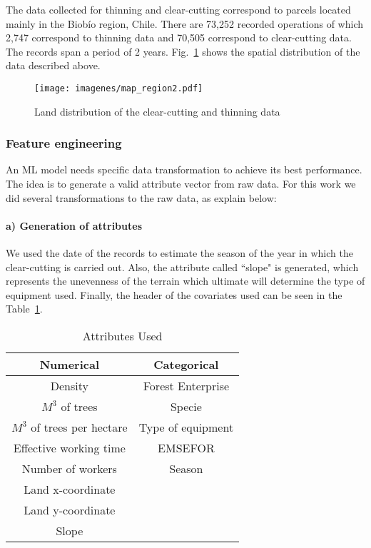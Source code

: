 \documentclass[conference]{IEEEtran}
\begin{document}
The data collected for thinning and clear-cutting correspond to parcels located mainly in the Biobío region, Chile. There are 73,252 recorded operations of which 2,747 correspond to thinning data and 70,505 correspond to clear-cutting data. The records span a period of 2 years. Fig.~\ref{fig1} shows the spatial distribution of the data described above.

\begin{figure}[htbp]
\centerline{\texttt{[image: imagenes/map\_region2.pdf]}}
\caption{Land distribution of the clear-cutting and thinning data}
\label{fig1}
\end{figure}

\subsubsection{Feature engineering}

An ML model needs specific data transformation to achieve its best performance. The idea is to generate a valid attribute vector from raw data. For this work we did several transformations to the raw data, as explain below:


\paragraph*{a) Generation of attributes} 

We used the date of the records to estimate the season of the year in which the clear-cutting is carried out. Also, the attribute called  ``slope" is generated, which represents the unevenness of the terrain which ultimate will determine the  type of equipment used. Finally, the header of the covariates used can be seen in the Table~\ref{table2}.


\begin{table}[!t]
\renewcommand{\arraystretch}{1.3}
\caption{Attributes Used}
\label{table2}
\centering
\begin{tabular}{c || c}
\hline
\bfseries Numerical & \bfseries Categorical\\
\hline\hline

Density	& Forest Enterprise  \\
$M^3 $ of trees & Specie \\
$M^3$ of trees per hectare & Type of equipment \\
Effective working time & EMSEFOR \\
Number of workers & Season \\
Land x-coordinate \\
Land y-coordinate \\
Slope \\

\hline
\end{tabular}
\end{table}
\end{document}
